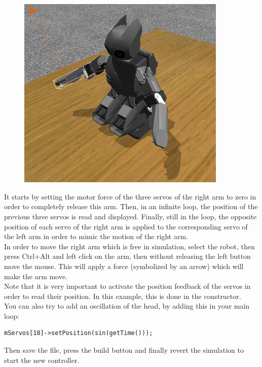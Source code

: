 \documentclass[a4paper, 12pt]{article}  		%
\begin{document}
\begin{figure}[H]
\begin{center}
\includegraphics[width=10cm]{example_symmetry.png}
\label{example_symmetry.png}
\end{center}
\end{figure}

It starts by setting the motor force of the three servos of the right arm to zero in order to completely release this arm.
Then, in an infinite loop, the position of the previous three servos is read and displayed.
Finally, still in the loop, the opposite position of each servo of the right arm is applied to the corresponding servo of the left arm in order to mimic the motion of the right arm.\\
In order to move the right arm which is free in simulation, select the robot, then press Ctrl+Alt and left click on the arm, then without releasing the left button move the mouse. This will apply a force (symbolized by an arrow) which will make the arm move.\\
Note that it is very important to activate the position feedback of the servos in order to read their position. In this example, this is done in the constructor.\\

You can also try to add an oscillation of the head, by adding this in your main loop:
\lstset{language=c++} 
\lstset{commentstyle=\textit} 
\begin{lstlisting} 
mServos[18]->setPosition(sin(getTime()));
\end{lstlisting}

Then save the file, press the build button and finally revert the simulation to start the new controller.\\
\end{document}
